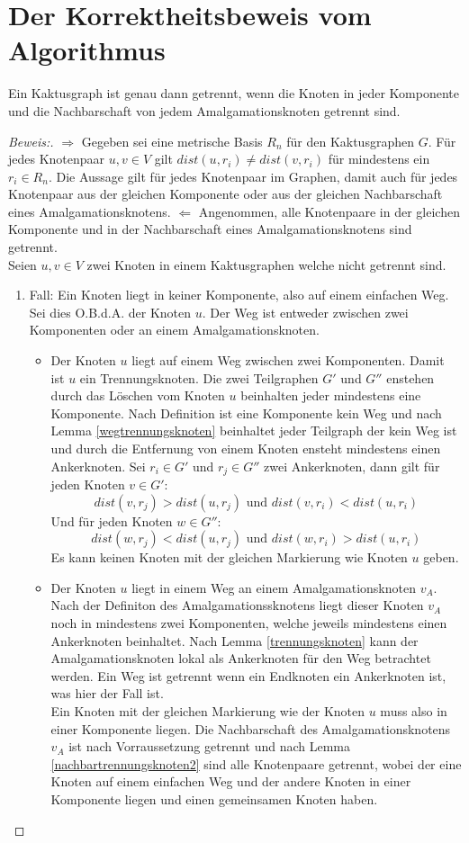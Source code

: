 \section{Der Korrektheitsbeweis vom Algorithmus}
\begin{lem}
Ein Kaktusgraph ist genau dann getrennt, wenn die Knoten in jeder Komponente und die Nachbarschaft von jedem Amalgamationsknoten getrennt sind.  
\end{lem}
\begin{proof}[Beweis:]
$\Longrightarrow$ Gegeben sei eine metrische Basis $R_n$ für den Kaktusgraphen $G$. Für jedes Knotenpaar $u,v \in V$ gilt $dist(u,r_i)\neq dist(v,r_i)$ für mindestens ein $r_i \in R_n$. Die Aussage gilt für jedes Knotenpaar im Graphen, damit auch für jedes Knotenpaar aus der gleichen Komponente oder aus der gleichen Nachbarschaft eines Amalgamationsknotens.\newline
$\Longleftarrow$ Angenommen, alle Knotenpaare in der gleichen Komponente und in der Nachbarschaft eines Amalgamationsknotens sind getrennt.\\
Seien $u,v \in V$ zwei Knoten in einem Kaktusgraphen welche nicht getrennt sind.
\begin{enumerate}
\item Fall: Ein Knoten liegt in keiner Komponente, also auf einem einfachen Weg. Sei dies O.B.d.A. der Knoten $u$. Der Weg ist entweder zwischen zwei Komponenten oder an einem Amalgamationsknoten.
\begin{itemize}
\item Der Knoten $u$ liegt auf einem Weg zwischen zwei Komponenten. Damit ist $u$ ein Trennungsknoten. Die zwei Teilgraphen $G'$ und $G''$ enstehen durch das Löschen vom Knoten $u$ beinhalten jeder mindestens eine Komponente. Nach Definition ist eine Komponente kein Weg und nach Lemma \ref{wegtrennungsknoten} beinhaltet jeder Teilgraph der kein Weg ist und durch die Entfernung von einem Knoten ensteht mindestens einen Ankerknoten. Sei $r_i \in G'$ und $r_j \in G''$ zwei Ankerknoten, dann gilt für jeden Knoten $v \in G'$:
$$ dist(v,r_j)>dist(u,r_j)\text{ und } dist(v,r_i)<dist(u,r_i)$$
Und für jeden Knoten $w \in G''$:
$$ dist(w,r_j)<dist(u,r_j)\text{ und } dist(w,r_i)>dist(u,r_i)$$
Es kann keinen Knoten mit der gleichen Markierung wie Knoten $u$ geben.
\item Der Knoten $u$ liegt in einem Weg an einem Amalgamationsknoten $v_A$. Nach der Definiton des Amalgamationssknotens liegt dieser Knoten $v_A$ noch in mindestens zwei Komponenten, welche jeweils mindestens einen Ankerknoten beinhaltet. Nach Lemma \ref{trennungsknoten} kann der Amalgamationsknoten lokal als Ankerknoten für den Weg betrachtet werden. Ein Weg ist getrennt wenn ein Endknoten ein Ankerknoten ist, was hier der Fall ist.\\Ein Knoten mit der gleichen Markierung wie der Knoten $u$ muss also in einer Komponente liegen. Die Nachbarschaft des Amalgamationsknotens $v_A$ ist nach Vorraussetzung getrennt und nach Lemma \ref{nachbartrennungsknoten2} sind alle Knotenpaare getrennt, wobei der eine Knoten auf einem einfachen Weg und der andere Knoten in einer Komponente liegen und einen gemeinsamen Knoten haben.  

\end{itemize}
\end{enumerate}
\end{proof}
